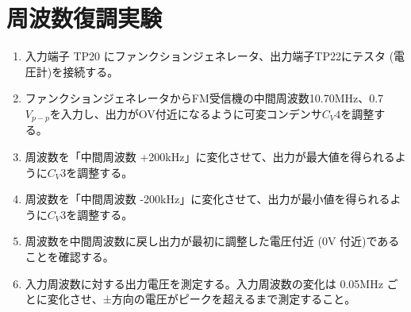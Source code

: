 \section{周波数復調実験}
\begin{enumerate}
  \item 入力端子 TP20 にファンクションジェネレータ、出力端子TP22にテスタ (電圧計)を接続する。\\
  \item ファンクションジェネレータからFM受信機の中間周波数10.70MHz、0.7$V_{p-p}$を入力し、出力がOV付近になるように可変コンデンサ$C_V4$を調整する。\\
  \item 周波数を「中間周波数 +200kHz」に変化させて、出力が最大値を得られるように$C_V3$を調整する。\\
  \item 周波数を「中間周波数 -200kHz」に変化させて、出力が最小値を得られるように$C_V3$を調整する。\\
  \item 周波数を中間周波数に戻し出力が最初に調整した電圧付近 (0V 付近)であることを確認する。\\
  \item 入力周波数に対する出力電圧を測定する。入力周波数の変化は 0.05MHz ごとに変化させ、±方向の電圧がピークを超えるまで測定すること。
\end{enumerate}


